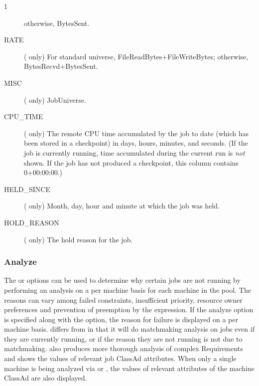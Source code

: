 \begin{ManPage}{\label{man-condor-q}}{1}
\begin{description}
    otherwise, BytesSent.
\item[RATE] ( only) For standard universe,
    FileReadBytes+FileWriteBytes; otherwise, BytesRecvd+BytesSent.
\item[MISC] ( only) JobUniverse.
\item[CPU\_TIME] ( only) The remote CPU time accumulated by
  the job to date
  (which has been stored in a checkpoint) in days, hours, minutes, and
  seconds.  (If the job is currently running, time accumulated during
  the current run is \emph{not} shown.  If the job has not produced a
  checkpoint, this column contains 0+00:00:00.)
\item[HELD\_SINCE] ( only) Month, day, hour and minute
  at which the job was held.
\item[HOLD\_REASON] ( only) The hold reason for the job.
\end{description}

\subsubsection*{Analyze}
The  or  options can be used to determine 
why certain jobs are not
running by performing an analysis on a per machine basis for each machine in 
the pool.  The reasons can vary among failed constraints, insufficient priority,
resource owner preferences and prevention of preemption by the 
 expression.  
If the analyze option  is specified 
along with the  option, the reason for failure is displayed on a 
per machine basis. 
 differs from  in that it will
do matchmaking analysis on jobs even if they are currently running, 
or if the reason they are not running is not due to matchmaking.
 also produces
more thorough analysis of complex Requirements and shows the values of 
relevant job ClassAd attributes.  
When only a single machine is being analyzed via  or
,
the values of relevant attributes of the machine ClassAd are also displayed.


\end{ManPage}

